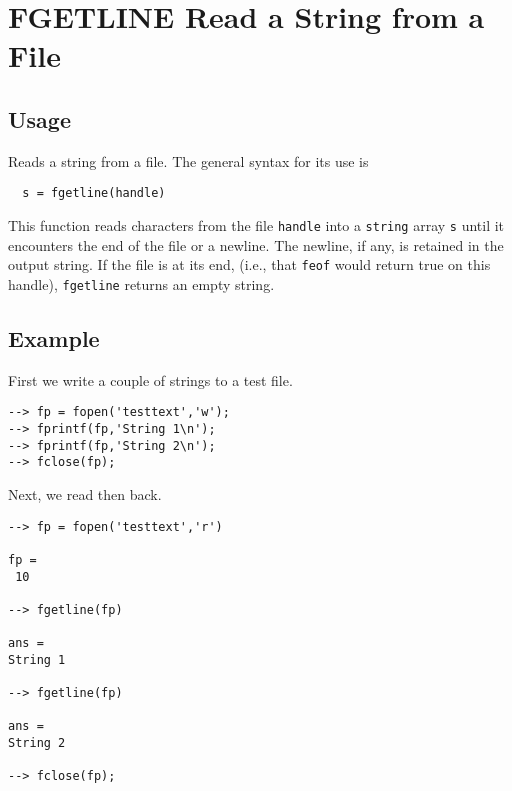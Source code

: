 \section{FGETLINE Read a String from a File}

\subsection{Usage}

Reads a string from a file.  The general syntax for its use
is
\begin{verbatim}
  s = fgetline(handle)
\end{verbatim}
This function reads characters from the file \verb|handle| into
a \verb|string| array \verb|s| until it encounters the end of the file
or a newline.  The newline, if any, is retained in the output
string.  If the file is at its end, (i.e., that \verb|feof| would
return true on this handle), \verb|fgetline| returns an empty
string.
\subsection{Example}

First we write a couple of strings to a test file.
\begin{verbatim}
--> fp = fopen('testtext','w');
--> fprintf(fp,'String 1\n');
--> fprintf(fp,'String 2\n');
--> fclose(fp);
\end{verbatim}
Next, we read then back.
\begin{verbatim}
--> fp = fopen('testtext','r')

fp = 
 10 

--> fgetline(fp)

ans = 
String 1

--> fgetline(fp)

ans = 
String 2

--> fclose(fp);
\end{verbatim}

